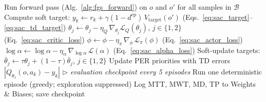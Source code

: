 \begin{algorithm}[ht]
\begin{algorithmic}[1]
      \State Run forward pass (Alg.~\ref{alg:fgs_forward}) on $o$ and $o'$ for all samples in $\mathcal{B}$
      \State Compute soft target: $y_k \leftarrow r_k + \gamma(1-d^{\mathrm{ep}})\,V_{\text{target}}(o')$ \hfill (Eqs.~\ref{eq:sac_target}--\ref{eq:sac_td_target})
      \State $\theta_j \leftarrow \theta_j - \eta_Q\,\nabla_{\!\theta_j}\mathcal{L}_Q(\theta_j)$, $j\in\{1,2\}$ \hfill (Eq.~\ref{eq:sac_critic_loss}) \label{alg:line_critic}
      \State $\phi \leftarrow \phi - \eta_\pi\,\nabla_\phi\,\mathcal{L}_\pi(\phi)$ \hfill (Eq.~\ref{eq:sac_actor_loss})
      \State $\log\alpha \leftarrow \log\alpha - \eta_\alpha\,\nabla_{\!\log\alpha}\,\mathcal{L}(\alpha)$ \hfill (Eq.~\ref{eq:sac_alpha_loss}) \label{alg:line_alpha}
      \State Soft-update targets: $\bar\theta_j \leftarrow \tau\theta_j + (1-\tau)\bar\theta_j$, $j\in\{1,2\}$
      \State Update PER priorities with TD errors $|Q_{\theta_1}(o,a_k) - y_k|$
    \EndIf
  \EndFor
   \hfill\(\triangleright\) \textit{evaluation checkpoint every 5 episodes}
    \State Run one deterministic episode (greedy; exploration suppressed)
    \State Log MTT, MWT, MD, TP to Weights \& Biases; save checkpoint
  \EndIf
\EndFor
\end{algorithmic}
\end{algorithm}

